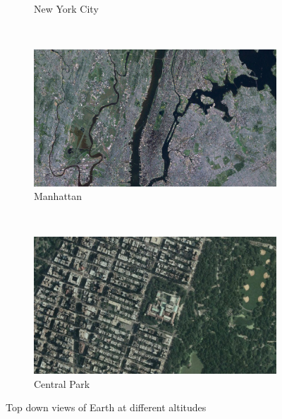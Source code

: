 \begin{figure}[h]
\begin{subfigure}[bt]{0.31\textwidth}
        \caption{New York City}
    \end{subfigure}
    ~
    \begin{subfigure}[bt]{0.31\textwidth}
        \includegraphics[width=\textwidth]{figures/results/topdown/topdown2.png}
        \caption{Manhattan}
    \end{subfigure}
    ~
    \begin{subfigure}[bt]{0.31\textwidth}
        \includegraphics[width=\textwidth]{figures/results/topdown/topdown1.png}
        \caption{Central Park}
    \end{subfigure}
    \caption{Top down views of Earth at different altitudes}
    \label{fig:topdown}
\end{figure}

